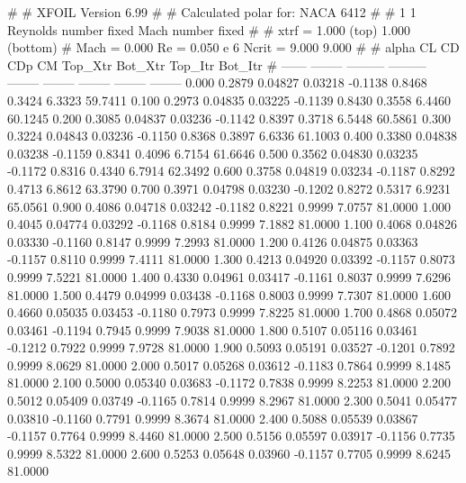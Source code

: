 #  
#       XFOIL         Version 6.99
#  
# Calculated polar for: NACA 6412                                       
#  
# 1 1 Reynolds number fixed          Mach number fixed         
#  
# xtrf =   1.000 (top)        1.000 (bottom)  
# Mach =   0.000     Re =     0.050 e 6     Ncrit =   9.000  9.000
#  
#   alpha    CL        CD       CDp       CM     Top_Xtr  Bot_Xtr  Top_Itr  Bot_Itr
#  ------ -------- --------- --------- -------- -------- -------- -------- --------
   0.000   0.2879   0.04827   0.03218  -0.1138   0.8468   0.3424   6.3323  59.7411
   0.100   0.2973   0.04835   0.03225  -0.1139   0.8430   0.3558   6.4460  60.1245
   0.200   0.3085   0.04837   0.03236  -0.1142   0.8397   0.3718   6.5448  60.5861
   0.300   0.3224   0.04843   0.03236  -0.1150   0.8368   0.3897   6.6336  61.1003
   0.400   0.3380   0.04838   0.03238  -0.1159   0.8341   0.4096   6.7154  61.6646
   0.500   0.3562   0.04830   0.03235  -0.1172   0.8316   0.4340   6.7914  62.3492
   0.600   0.3758   0.04819   0.03234  -0.1187   0.8292   0.4713   6.8612  63.3790
   0.700   0.3971   0.04798   0.03230  -0.1202   0.8272   0.5317   6.9231  65.0561
   0.900   0.4086   0.04718   0.03242  -0.1182   0.8221   0.9999   7.0757  81.0000
   1.000   0.4045   0.04774   0.03292  -0.1168   0.8184   0.9999   7.1882  81.0000
   1.100   0.4068   0.04826   0.03330  -0.1160   0.8147   0.9999   7.2993  81.0000
   1.200   0.4126   0.04875   0.03363  -0.1157   0.8110   0.9999   7.4111  81.0000
   1.300   0.4213   0.04920   0.03392  -0.1157   0.8073   0.9999   7.5221  81.0000
   1.400   0.4330   0.04961   0.03417  -0.1161   0.8037   0.9999   7.6296  81.0000
   1.500   0.4479   0.04999   0.03438  -0.1168   0.8003   0.9999   7.7307  81.0000
   1.600   0.4660   0.05035   0.03453  -0.1180   0.7973   0.9999   7.8225  81.0000
   1.700   0.4868   0.05072   0.03461  -0.1194   0.7945   0.9999   7.9038  81.0000
   1.800   0.5107   0.05116   0.03461  -0.1212   0.7922   0.9999   7.9728  81.0000
   1.900   0.5093   0.05191   0.03527  -0.1201   0.7892   0.9999   8.0629  81.0000
   2.000   0.5017   0.05268   0.03612  -0.1183   0.7864   0.9999   8.1485  81.0000
   2.100   0.5000   0.05340   0.03683  -0.1172   0.7838   0.9999   8.2253  81.0000
   2.200   0.5012   0.05409   0.03749  -0.1165   0.7814   0.9999   8.2967  81.0000
   2.300   0.5041   0.05477   0.03810  -0.1160   0.7791   0.9999   8.3674  81.0000
   2.400   0.5088   0.05539   0.03867  -0.1157   0.7764   0.9999   8.4460  81.0000
   2.500   0.5156   0.05597   0.03917  -0.1156   0.7735   0.9999   8.5322  81.0000
   2.600   0.5253   0.05648   0.03960  -0.1157   0.7705   0.9999   8.6245  81.0000
